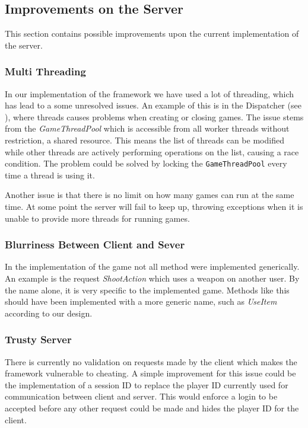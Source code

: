 \subsection{Improvements on the Server}
This section contains possible improvements upon the current implementation of the server. 

\subsubsection{Multi Threading}
In our implementation of the framework we have used a lot of threading, which has lead to a some unresolved issues. An example of this is in the Dispatcher (see ), where threads causes problems when creating or closing games. The issue stems from the \textit{GameThreadPool} which is accessible from all worker threads without restriction, a shared resource. This means the list of threads can be modified while other threads are actively performing operations on the list, causing a race condition. The problem could be solved by locking the \texttt{GameThreadPool} every time a thread is using it.

Another issue is that there is no limit on how many games can run at the same time. At some point the server will fail to keep up, throwing exceptions when it is unable to provide more threads for running games.

\subsubsection{Blurriness Between Client and Sever}
In the implementation of the game not all method were implemented generically. An example is the request \textit{ShootAction} which uses a weapon on another user. By the name alone, it is very specific to the implemented game. Methods like this should have been implemented with a more generic name, such as \textit{UseItem} according to our design.

\subsubsection{Trusty Server}
There is currently no validation on requests made by the client which makes the framework vulnerable to cheating. A simple improvement for this issue could be the implementation of a session ID to replace the player ID currently used for communication between client and server. This would enforce a login to be accepted before any other request could be made and hides the player ID for the client.